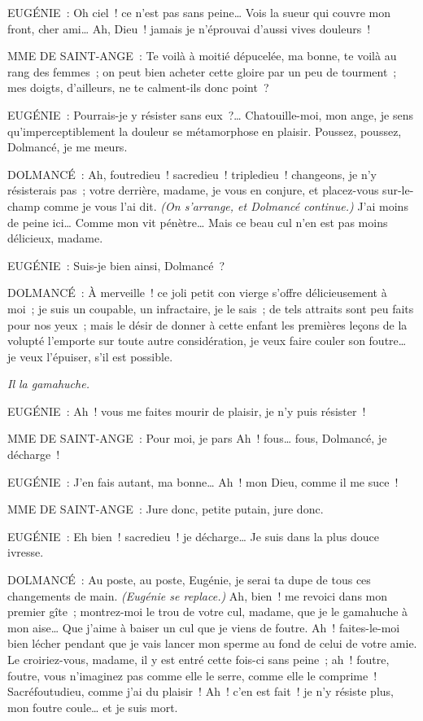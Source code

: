\documentclass[french,twoside]{book} %
\begin{document}
EUGÉNIE : Oh ciel ! ce n’est pas sans peine… Vois la sueur qui couvre mon front, cher ami… Ah, Dieu ! jamais je n’éprouvai d’aussi vives douleurs !\par
MME DE SAINT-ANGE : Te voilà à moitié dépucelée, ma bonne, te voilà au rang des femmes ; on peut bien acheter cette gloire par un peu de tourment ; mes doigts, d’ailleurs, ne te calment-ils donc point ?\par
EUGÉNIE : Pourrais-je y résister sans eux ?… Chatouille-moi, mon ange, je sens qu’imperceptiblement la douleur se métamorphose en plaisir. Poussez, poussez, Dolmancé, je me meurs.\par
DOLMANCÉ : Ah, foutredieu ! sacredieu ! tripledieu ! changeons, je n’y résisterais pas ; votre derrière, madame, je vous en conjure, et placez-vous sur-le-champ comme je vous l’ai dit. {\itshape (On s’arrange, et Dolmancé continue.)} J’ai moins de peine ici… Comme mon vit pénètre… Mais ce beau cul n’en est pas moins délicieux, madame.\par
EUGÉNIE : Suis-je bien ainsi, Dolmancé ?\par
DOLMANCÉ : À merveille ! ce joli petit con vierge s’offre délicieusement à moi ; je suis un coupable, un infractaire, je le sais ; de tels attraits sont peu faits pour nos yeux ; mais le désir de donner à cette enfant les premières leçons de la volupté l’emporte sur toute autre considération, je veux faire couler son foutre… je veux l’épuiser, s’il est possible.\par
{\itshape Il la gamahuche.}\par
EUGÉNIE : Ah ! vous me faites mourir de plaisir, je n’y puis résister !\par
MME DE SAINT-ANGE : Pour moi, je pars Ah ! fous… fous, Dolmancé, je décharge !\par
EUGÉNIE : J’en fais autant, ma bonne… Ah ! mon Dieu, comme il me suce !\par
MME DE SAINT-ANGE : Jure donc, petite putain, jure donc.\par
EUGÉNIE : Eh bien ! sacredieu ! je décharge… Je suis dans la plus douce ivresse.\par
DOLMANCÉ : Au poste, au poste, Eugénie, je serai ta dupe de tous ces changements de main. {\itshape (Eugénie se replace.)} Ah, bien ! me revoici dans mon premier gîte ; montrez-moi le trou de votre cul, madame, que je le gamahuche à mon aise… Que j’aime à baiser un cul que je viens de foutre. Ah ! faites-le-moi bien lécher pendant que je vais lancer mon sperme au fond de celui de votre amie. Le croiriez-vous, madame, il y est entré cette fois-ci sans peine ; ah ! foutre, foutre, vous n’imaginez pas comme elle le serre, comme elle le comprime ! Sacréfoutudieu, comme j’ai du plaisir ! Ah ! c’en est fait ! je n’y résiste plus, mon foutre coule… et je suis mort.\par
\end{document}
